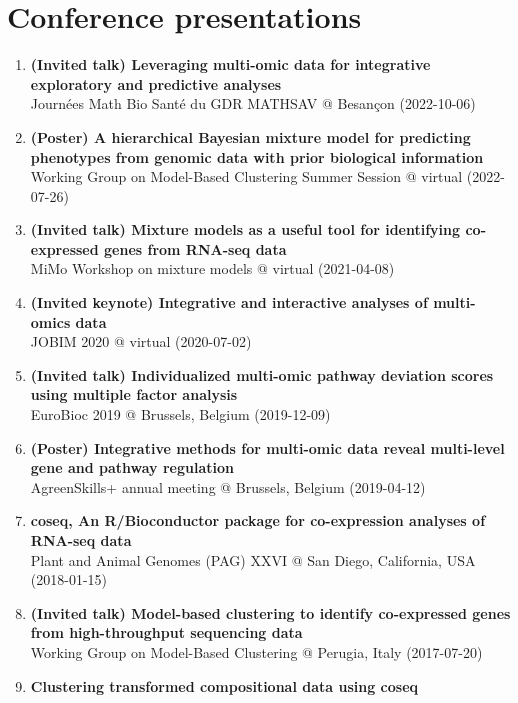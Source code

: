 \documentclass[11pt, a4paper]{awesome-cv}
\providecommand{\tightlist}{%
	\setlength{\itemsep}{0pt}\setlength{\parskip}{0pt}}
\begin{document}
\hypertarget{conference-presentations}{%
\section{Conference presentations}\label{conference-presentations}}

\begin{enumerate}
\def\labelenumi{\arabic{enumi}.}
\tightlist
\item
  \textbf{(Invited talk) Leveraging multi-omic data for integrative
  exploratory and predictive analyses}\\
  Journées Math Bio Santé du GDR MATHSAV @ Besançon (2022-10-06)
\item
  \textbf{(Poster) A hierarchical Bayesian mixture model for predicting
  phenotypes from genomic data with prior biological information}\\
  Working Group on Model-Based Clustering Summer Session @ virtual
  (2022-07-26)
\item
  \textbf{(Invited talk) Mixture models as a useful tool for identifying
  co-expressed genes from RNA-seq data}\\
  MiMo Workshop on mixture models @ virtual (2021-04-08)
\item
  \textbf{(Invited keynote) Integrative and interactive analyses of
  multi-omics data}\\
  JOBIM 2020 @ virtual (2020-07-02)
\item
  \textbf{(Invited talk) Individualized multi-omic pathway deviation
  scores using multiple factor analysis}\\
  EuroBioc 2019 @ Brussels, Belgium (2019-12-09)
\item
  \textbf{(Poster) Integrative methods for multi-omic data reveal
  multi-level gene and pathway regulation}\\
  AgreenSkills+ annual meeting @ Brussels, Belgium (2019-04-12)
\item
  \textbf{coseq, An R/Bioconductor package for co-expression analyses of
  RNA-seq data}\\
  Plant and Animal Genomes (PAG) XXVI @ San Diego, California, USA
  (2018-01-15)
\item
  \textbf{(Invited talk) Model-based clustering to identify co-expressed
  genes from high-throughput sequencing data}\\
  Working Group on Model-Based Clustering @ Perugia, Italy (2017-07-20)
\item
  \textbf{Clustering transformed compositional data using coseq}\\

\end{enumerate}
\end{document}

